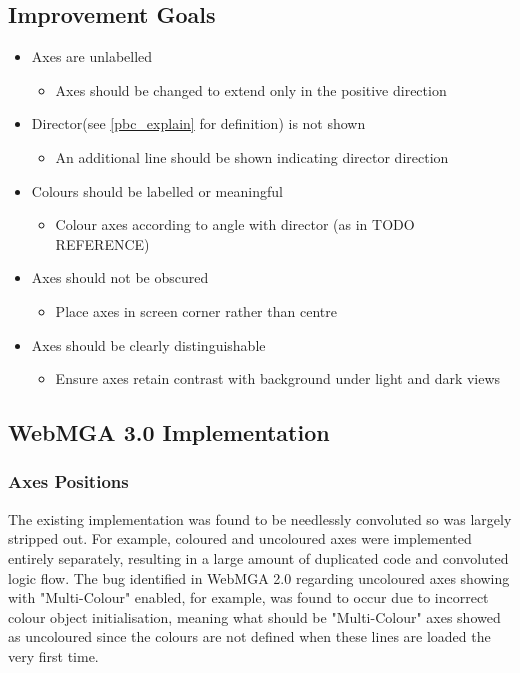 \subsection{Improvement Goals}
\begin{itemize}
  \item Axes are unlabelled
    \begin{itemize}
      \item Axes should be changed to extend only in the positive direction
    \end{itemize}
  \item Director(see \cref{pbc_explain} for definition) is not shown
    \begin{itemize}
      \item An additional line should be shown indicating director direction
    \end{itemize}
  \item Colours should be labelled or meaningful
    \begin{itemize}
      \item Colour axes according to angle with director (as in TODO REFERENCE)
    \end{itemize}
  \item Axes should not be obscured
    \begin{itemize}
      \item Place axes in screen corner rather than centre
    \end{itemize}
  \item Axes should be clearly distinguishable
    \begin{itemize}
      \item Ensure axes retain contrast with background under light and dark views
    \end{itemize}
\end{itemize}

\subsection{WebMGA 3.0 Implementation}
\subsubsection{Axes Positions}
The existing implementation was found to be needlessly convoluted so was largely stripped out. For example, coloured and uncoloured axes were implemented entirely separately, resulting in a large amount of duplicated code and convoluted logic flow. The bug identified in WebMGA 2.0 regarding uncoloured axes showing with "Multi-Colour" enabled, for example, was found to occur due to incorrect colour object initialisation, meaning what should be "Multi-Colour" axes showed as uncoloured since the colours are not defined when these lines are loaded the very first time.

